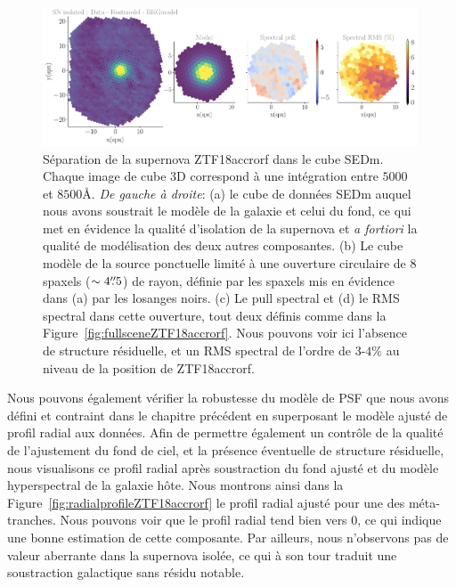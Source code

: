 \documentclass[../main/main.tex]{subfiles}
\begin{document}
\begin{figure}
  \centering
  \includegraphics[width=0.99\textwidth]{../figures/07_scene/output_sn_ifu_ZTF18accrorf.pdf}
  \caption[Séparation de la supernova ZTF18accrorf dans le cube
  SEDm.]{Séparation de la supernova ZTF18accrorf dans le cube
    SEDm. Chaque image de cube 3D correspond à une intégration entre
    $5000$ et $8500$\AA. \emph{De gauche à droite}: (a) le cube de données SEDm auquel
    nous avons soustrait le modèle de la galaxie et celui du fond, ce
    qui met en évidence la qualité d'isolation de la supernova et \textit{a
    fortiori} la qualité de modélisation des deux autres composantes. (b)
  Le cube modèle de la source ponctuelle limité à une ouverture
  circulaire de $8$ spaxels ($\sim4\overset{\prime\prime}{.}5$) de
rayon, définie par les spaxels mis en évidence dans (a) par les losanges
noirs. (c) Le pull spectral et (d) le RMS spectral dans cette ouverture,
tout deux définis comme dans la
Figure~\ref{fig:fullsceneZTF18accrorf}. Nous pouvons voir ici l'absence
de structure résiduelle, et un RMS spectral de l'ordre de $3$-$4\%$ au niveau de la position de ZTF18accrorf.}
  \label{fig:targetisolatedZTF18accrorf}
\end{figure}

Nous pouvons également vérifier la robustesse du modèle de PSF que nous
avons défini et contraint dans le chapitre précédent en superposant le
modèle ajusté de profil radial aux données. Afin de permettre également
un contrôle de la qualité de l'ajustement du fond de ciel, et la
présence éventuelle de structure résiduelle, nous visualisons ce profil
radial après soustraction du fond ajusté et du modèle hyperspectral de
la galaxie hôte. Nous montrons ainsi dans la
Figure~\ref{fig:radialprofileZTF18accrorf} le profil radial ajusté pour
une des méta-tranches. Nous pouvons voir que le profil radial tend bien
vers $0$, ce qui indique une bonne estimation de cette composante. Par
ailleurs, nous n'observons pas de valeur aberrante dans la supernova
isolée, ce qui à son tour traduit une soustraction galactique sans
résidu notable.
\end{document}
